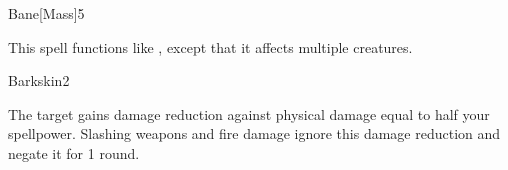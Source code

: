 \begin{spellsection}{Bane}[Mass]{5}
    \begin{spellheader}
    \end{spellheader}
    \begin{spellcontent}
        \begin{spelltargetinginfo}
        \end{spelltargetinginfo}
        \begin{spelleffects}
            \spellspecial This spell functions like , except that it affects multiple creatures.
        \end{spelleffects}
    \end{spellcontent}
    \begin{spellfooter}
        \miscastexplode
    \end{spellfooter}
\end{spellsection}

\begin{spellsection}{Barkskin}{2}
    \begin{spellheader}
    \end{spellheader}
    \begin{spellcontent}
        \begin{spelltargetinginfo}
        \end{spelltargetinginfo}
        \begin{spelleffects}
            \spelleffect The target gains damage reduction against physical damage equal to half your spellpower. Slashing weapons and fire damage ignore this damage reduction and negate it for 1 round.
            \spelldur \durpersonallong
        \end{spelleffects}
    \end{spellcontent}
    \begin{spellfooter}
        \miscastexplode
    \end{spellfooter}
\end{spellsection}

